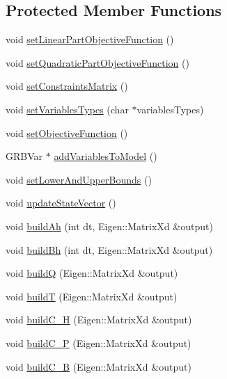 \subsection*{\-Protected \-Member \-Functions}
\begin{DoxyCompactItemize}
\item 
void \hyperlink{classMIQPController_a2d882a4cd9e9832d8b9b2ad73111be0f}{set\-Linear\-Part\-Objective\-Function} ()
\item 
void \hyperlink{classMIQPController_ae61af28f2062b4372ce9c5cb37ebb161}{set\-Quadratic\-Part\-Objective\-Function} ()
\item 
void \hyperlink{classMIQPController_a65b06fe436dc1683ac56afcbed2e4cfe}{set\-Constraints\-Matrix} ()
\item 
void \hyperlink{classMIQPController_a3f15855fdab618e9f3b51c2b7df52b4e}{set\-Variables\-Types} (char $\ast$variables\-Types)
\item 
void \hyperlink{classMIQPController_a1bb6f0a6b520aa1ee18fe59c760f8aa8}{set\-Objective\-Function} ()
\item 
\-G\-R\-B\-Var $\ast$ \hyperlink{classMIQPController_a8a4200f8a98ec13b93dfab56eb5cc423}{add\-Variables\-To\-Model} ()
\item 
void \hyperlink{classMIQPController_a2caf42a5b5dcd63d67de57cfbb93c653}{set\-Lower\-And\-Upper\-Bounds} ()
\item 
void \hyperlink{classMIQPController_a8320465a1ec80d0cf7ba0d17652feba5}{update\-State\-Vector} ()
\item 
void \hyperlink{classMIQPController_aea16b6eac86da5330c7ffbfdb9c655f5}{build\-Ah} (int dt, \-Eigen\-::\-Matrix\-Xd \&output)
\item 
void \hyperlink{classMIQPController_afc2df705b1238e2503e35f07e2f8270a}{build\-Bh} (int dt, \-Eigen\-::\-Matrix\-Xd \&output)
\item 
void \hyperlink{classMIQPController_af492dfbff2e211ff1c1351c2193fe669}{build\-Q} (\-Eigen\-::\-Matrix\-Xd \&output)
\item 
void \hyperlink{classMIQPController_a52dc10cbc0941a6e4f4e6ffd462fffce}{build\-T} (\-Eigen\-::\-Matrix\-Xd \&output)
\item 
void \hyperlink{classMIQPController_aa58686fc2883ef2d81d3e6d3554b338d}{build\-C\-\_\-\-H} (\-Eigen\-::\-Matrix\-Xd \&output)
\item 
void \hyperlink{classMIQPController_ac2a454e236bdb3a13b72b6930329f231}{build\-C\-\_\-\-P} (\-Eigen\-::\-Matrix\-Xd \&output)
\item 
void \hyperlink{classMIQPController_a1be33f8ebb313f7ecddd2aa6af4fa62c}{build\-C\-\_\-\-B} (\-Eigen\-::\-Matrix\-Xd \&output)

\end{DoxyCompactItemize}
